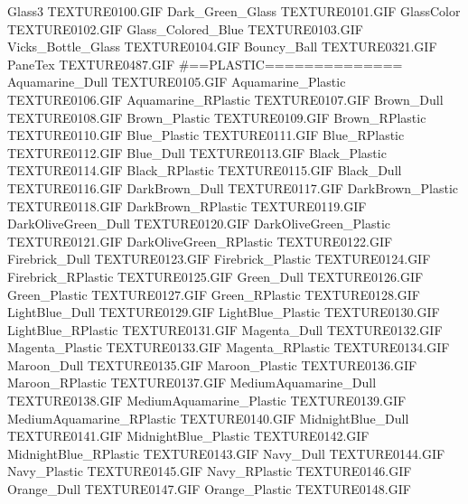 Glass3                         TEXTURE\TEX0100.GIF
Dark_Green_Glass               TEXTURE\TEX0101.GIF
GlassColor                     TEXTURE\TEX0102.GIF
Glass_Colored_Blue             TEXTURE\TEX0103.GIF
Vicks_Bottle_Glass             TEXTURE\TEX0104.GIF
Bouncy_Ball                    TEXTURE\TEX0321.GIF
PaneTex                        TEXTURE\TEX0487.GIF
#==PLASTIC==============
Aquamarine_Dull                TEXTURE\TEX0105.GIF
Aquamarine_Plastic             TEXTURE\TEX0106.GIF
Aquamarine_RPlastic            TEXTURE\TEX0107.GIF
Brown_Dull                     TEXTURE\TEX0108.GIF
Brown_Plastic                  TEXTURE\TEX0109.GIF
Brown_RPlastic                 TEXTURE\TEX0110.GIF
Blue_Plastic                   TEXTURE\TEX0111.GIF
Blue_RPlastic                  TEXTURE\TEX0112.GIF
Blue_Dull                      TEXTURE\TEX0113.GIF
Black_Plastic                  TEXTURE\TEX0114.GIF
Black_RPlastic                 TEXTURE\TEX0115.GIF
Black_Dull                     TEXTURE\TEX0116.GIF
DarkBrown_Dull                 TEXTURE\TEX0117.GIF
DarkBrown_Plastic              TEXTURE\TEX0118.GIF
DarkBrown_RPlastic             TEXTURE\TEX0119.GIF
DarkOliveGreen_Dull            TEXTURE\TEX0120.GIF
DarkOliveGreen_Plastic         TEXTURE\TEX0121.GIF
DarkOliveGreen_RPlastic        TEXTURE\TEX0122.GIF
Firebrick_Dull                 TEXTURE\TEX0123.GIF
Firebrick_Plastic              TEXTURE\TEX0124.GIF
Firebrick_RPlastic             TEXTURE\TEX0125.GIF
Green_Dull                     TEXTURE\TEX0126.GIF
Green_Plastic                  TEXTURE\TEX0127.GIF
Green_RPlastic                 TEXTURE\TEX0128.GIF
LightBlue_Dull                 TEXTURE\TEX0129.GIF
LightBlue_Plastic              TEXTURE\TEX0130.GIF
LightBlue_RPlastic             TEXTURE\TEX0131.GIF
Magenta_Dull                   TEXTURE\TEX0132.GIF
Magenta_Plastic                TEXTURE\TEX0133.GIF
Magenta_RPlastic               TEXTURE\TEX0134.GIF
Maroon_Dull                    TEXTURE\TEX0135.GIF
Maroon_Plastic                 TEXTURE\TEX0136.GIF
Maroon_RPlastic                TEXTURE\TEX0137.GIF
MediumAquamarine_Dull          TEXTURE\TEX0138.GIF
MediumAquamarine_Plastic       TEXTURE\TEX0139.GIF
MediumAquamarine_RPlastic      TEXTURE\TEX0140.GIF
MidnightBlue_Dull              TEXTURE\TEX0141.GIF
MidnightBlue_Plastic           TEXTURE\TEX0142.GIF
MidnightBlue_RPlastic          TEXTURE\TEX0143.GIF
Navy_Dull                      TEXTURE\TEX0144.GIF
Navy_Plastic                   TEXTURE\TEX0145.GIF
Navy_RPlastic                  TEXTURE\TEX0146.GIF
Orange_Dull                    TEXTURE\TEX0147.GIF
Orange_Plastic                 TEXTURE\TEX0148.GIF

